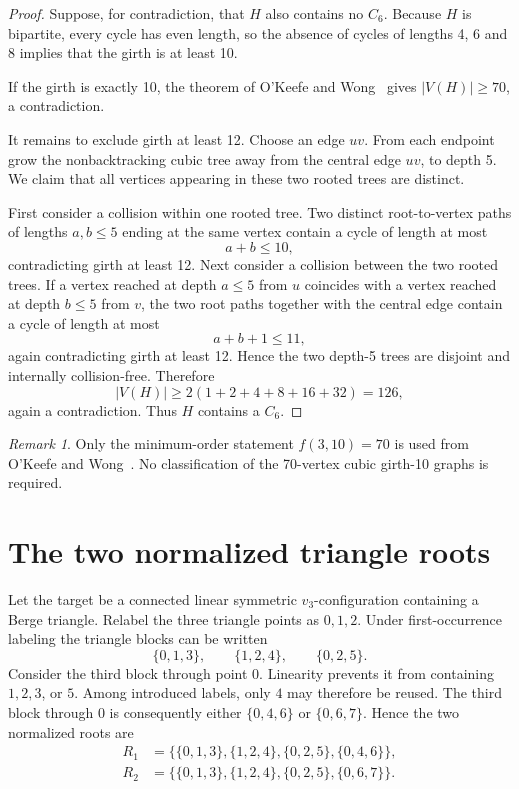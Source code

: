 \documentclass[11pt]{article}
\theoremstyle{remark}
\newtheorem{remark}[theorem]{Remark}
\newcommand{\Csix}{C_6}
\newcommand{\vthree}{v_3}
\begin{document}
\begin{proof}
Suppose, for contradiction, that \(H\) also contains no \(\Csix\).  Because \(H\) is bipartite, every cycle has even length, so the absence of cycles of lengths 4, 6 and 8 implies that the girth is at least 10.

If the girth is exactly 10, the theorem of O'Keefe and Wong~\cite{okeefe1980} gives \(|V(H)|\ge 70\), a contradiction.

It remains to exclude girth at least 12.  Choose an edge \(uv\).  From each endpoint grow the nonbacktracking cubic tree away from the central edge \(uv\), to depth 5.  We claim that all vertices appearing in these two rooted trees are distinct.

First consider a collision within one rooted tree.  Two distinct root-to-vertex paths of lengths \(a,b\le 5\) ending at the same vertex contain a cycle of length at most
\[
a+b\le 10,
\]
contradicting girth at least 12.  Next consider a collision between the two rooted trees.  If a vertex reached at depth \(a\le 5\) from \(u\) coincides with a vertex reached at depth \(b\le 5\) from \(v\), the two root paths together with the central edge contain a cycle of length at most
\[
a+b+1\le 11,
\]
again contradicting girth at least 12.  Hence the two depth-5 trees are disjoint and internally collision-free.  Therefore
\[
|V(H)|\ge 2(1+2+4+8+16+32)=126,
\]
again a contradiction.  Thus \(H\) contains a \(\Csix\).
\end{proof}

\begin{remark}\label{rem:okeefe}
Only the minimum-order statement \(f(3,10)=70\) is used from O'Keefe and Wong~\cite{okeefe1980}.  No classification of the 70-vertex cubic girth-10 graphs is required.
\end{remark}

\section{The two normalized triangle roots}\label{sec:roots}

Let the target be a connected linear symmetric \(\vthree\)-configuration containing a Berge triangle.  Relabel the three triangle points as \(0,1,2\).  Under first-occurrence labeling the triangle blocks can be written
\[
\{0,1,3\},\qquad \{1,2,4\},\qquad \{0,2,5\}.
\]
Consider the third block through point \(0\).  Linearity prevents it from containing \(1,2,3\), or \(5\).  Among introduced labels, only \(4\) may therefore be reused.  The third block through \(0\) is consequently either \(\{0,4,6\}\) or \(\{0,6,7\}\).  Hence the two normalized roots are
\begin{align*}
R_1&=\bigl\{\{0,1,3\},\{1,2,4\},\{0,2,5\},\{0,4,6\}\bigr\},\\
R_2&=\bigl\{\{0,1,3\},\{1,2,4\},\{0,2,5\},\{0,6,7\}\bigr\}.
\end{align*}
\end{document}
